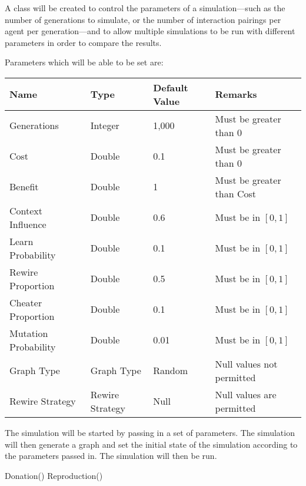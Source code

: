 A class will be created to control the parameters of a simulation---such
as the number of generations to simulate, or the number of interaction
pairings per agent per generation---and to allow multiple simulations to
be run with different parameters in order to compare the results.

Parameters which will be able to be set are:

\begin{tabular}{llll}
    Name & Type & Default Value & Remarks \\
    \hline
    Generations & Integer & 1,000 & Must be greater than 0\\
    Cost & Double & 0.1 & Must be greater than 0 \\
    Benefit & Double & 1 & Must be greater than Cost \\
    Context Influence & Double & 0.6 & Must be in $[0, 1]$ \\
    Learn Probability & Double & 0.1 & Must be in $[0, 1]$ \\
    Rewire Proportion & Double & 0.5 & Must be in $[0, 1]$ \\
    Cheater Proportion & Double & 0.1 & Must be in $[0, 1]$ \\
    Mutation Probability & Double & 0.01 & Must be in $[0, 1]$ \\
    Graph Type & Graph Type & Random & Null values not permitted \\
    Rewire Strategy & Rewire Strategy & Null & Null values are permitted
    \\
\end{tabular}

The simulation will be started by passing in a set of parameters.
The simulation will then generate a graph and set the initial state of
the simulation according to the parameters passed in.
The simulation will then be run.

\begin{algorithmic}
    \State Donation()
    \State Reproduction()
\EndWhile
\end{algorithmic}

